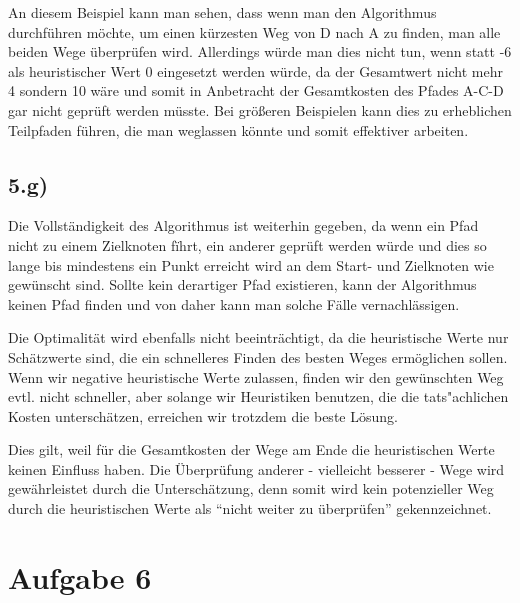 \documentclass[a4paper]{article}
\begin{document}
An diesem Beispiel kann man sehen, dass wenn man den Algorithmus durchf\"uhren m\"ochte, um einen k\"urzesten Weg von D nach A zu finden, man alle beiden Wege \"uberpr\"ufen wird. Allerdings w\"urde man dies nicht tun, wenn statt -6 als heuristischer Wert 0 eingesetzt werden w\"urde, da der Gesamtwert nicht mehr 4 sondern 10 w\"are und somit in Anbetracht der Gesamtkosten des Pfades A-C-D gar nicht gepr\"uft werden m\"usste. Bei gr\"o{\ss}eren Beispielen kann dies zu erheblichen Teilpfaden f\"uhren, die man weglassen k\"onnte und somit effektiver arbeiten.

\subsection*{5.g)}
Die Vollst\"andigkeit des Algorithmus ist weiterhin gegeben, da wenn ein Pfad nicht zu einem Zielknoten f\"ihrt, ein anderer gepr\"uft werden w\"urde und dies so lange bis mindestens ein Punkt erreicht wird an dem Start- und Zielknoten wie gew\"unscht sind. Sollte kein
derartiger Pfad existieren, kann der Algorithmus keinen Pfad finden und von daher kann man solche F\"alle vernachl\"assigen.

Die Optimalit\"at wird ebenfalls nicht beeintr\"achtigt, da die heuristische Werte nur Sch\"atzwerte sind, die ein schnelleres Finden des besten Weges erm\"oglichen sollen. Wenn wir negative heuristische Werte zulassen, finden wir den gew\"unschten Weg evtl. nicht schneller, aber solange wir Heuristiken benutzen, die die tats"achlichen Kosten untersch\"atzen, erreichen wir trotzdem die beste L\"osung.

Dies gilt, weil f\"ur die Gesamtkosten der Wege am Ende die heuristischen Werte keinen Einfluss haben. Die \"Uberpr\"ufung anderer - vielleicht besserer - Wege wird gew\"ahrleistet durch die Untersch\"atzung, denn somit wird kein potenzieller Weg durch die heuristischen Werte als "`nicht weiter zu \"uberpr\"ufen"' gekennzeichnet.

\section*{Aufgabe 6}
\end{document}

